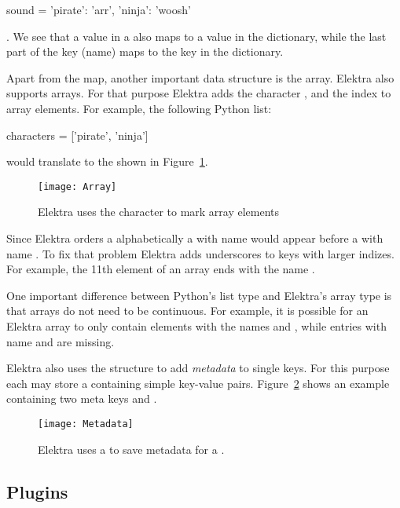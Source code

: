 \begin{pythoncode}
  sound = {'pirate': 'arr', 'ninja': 'woosh'}
\end{pythoncode}

. We see that a value in a  also maps to a value in the dictionary, while the last part of the key (name) maps to the key in the dictionary.

Apart from the map, another important data structure is the array. Elektra also supports arrays. For that purpose Elektra adds the character \code{\#}, and the index to array elements. For example, the following Python list:

\begin{pythoncode}
  characters = ['pirate', 'ninja']
\end{pythoncode}

would translate to the  shown in Figure~\ref{fig:array}.

\begin{figure}
  \centering
    \texttt{[image: Array]}
  \caption{Elektra uses the character \code{\#} to mark array elements}
  \label{fig:array}
\end{figure}

Since Elektra orders a  alphabetically a  with name  would appear before a  with name . To fix that problem Elektra adds underscores to keys with larger indizes. For example, the 11th element of an array ends with the name .

One important difference between Python’s list type and Elektra’s array type is that arrays do not need to be continuous. For example, it is possible for an Elektra array to only contain elements with the names  and , while  entries with name  and  are missing.

Elektra also uses the  structure to add \emph{metadata} to single keys. For this purpose each  may store a  containing simple key-value pairs. Figure~\ref{fig:metadata} shows an example  containing two meta keys  and .

\begin{figure}
  \centering
    \texttt{[image: Metadata]}
  \caption{Elektra uses a  to save metadata for a .}
  \label{fig:metadata}
\end{figure}

\FloatBarrier
\subsection{Plugins}
\label{sec:plugins}

